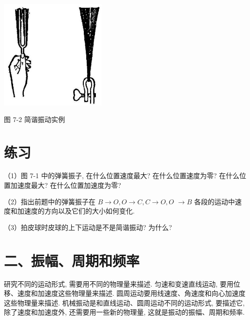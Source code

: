 \documentclass[10pt]{article}
\begin{document}
\begin{center}
\includegraphics[max width=0.4\textwidth]{images/01912d55-147c-70aa-b0e0-1782a122f948_193_452795.jpg}
\end{center}

图 7-2 简谐振动实例

\section*{练习}

（1）图 7-1 中的弹簧振子, 在什么位置速度最大? 在什么位置速度为零? 在什么位置加速度最大? 在什么位置加速度为零?

（2）指出前题中的弹簧振子在 \(B \rightarrow O,O \rightarrow C,C \rightarrow O,O\) \(\rightarrow B\) 各段的运动中速度和加速度的方向以及它们的大小如何变化.

\begin{center}
\end{center}

（3）拍皮球时皮球的上下运动是不是简谐振动? 为什么?

\section*{二、振幅、周期和频率}

研究不同的运动形式, 需要用不同的物理量来描述. 匀速和变速直线运动, 要用位移、速度和加速度这些物理量来描述. 圆周运动要用线速度、角速度和向心加速度这些物理量来描述. 机械振动是和直线运动、圆周运动不同的运动形式, 要描述它, 除了速度和加速度外, 还需要用一些新的物理量, 这就是振动的振幅、周期和频率.
\end{document}

